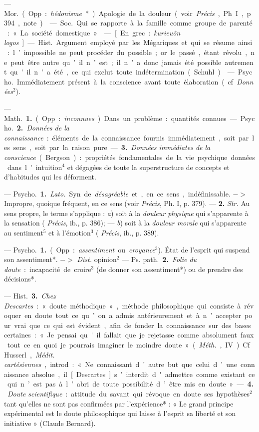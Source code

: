 \begin{itemize}[leftmargin=1cm, label=, itemsep=1pt]
 — \si{Mor.} (Opp. : {\it hédonisme}*).
Apologie de la douleur (voir  {\it Précis},
Ph. I, p. 394, note).

 — \si{Soc.} Qui se rapporte à
la famille comme groupe de parenté :
« La société domestique ».

 — [En grec : {\it kurieuôn logos}] — \si{Hist.}
Argument employé par les Mégariques et qui se résume ainsi : l’impossible ne
peut procéder du possible ; or le passé, étant révolu, ne peut être autre
qu’il n’est ; il n’a donc jamais été possible autrement qu'il n'a été, ce qui
exclut toute indétermination (Schuhl).

 — \si{Psycho.} Immédiatement
présent à la conscience avant toute
élaboration (cf. {\it Données}$^2$).

 — \si{Math.} {\bf 1.} (Opp. : {\it inconnues}).
Dans un problème : quantités connues.

— \si{Psycho.} {\bf 2.} {\it Données de la connaissance} :
éléments de la connaissance fournis immédiatement, soit
par les sens, soit par la raison pure.
— {\bf 3.} {\it Données immédiates de la conscience} (Bergson) :
propriétés fondamentales de la vie psychique données dans l'intuition$^4$
et dégagées de toute la superstructure de concepts
et d’habitudes qui les déforment.

 — \si{Psycho.} {\bf 1.} {\it Lato.} Syn. de
{\it désagréable} et, en ce sens, indéfinissable. $->$ Impropre, quoique fréquent, en ce sens (voir  {\it Précis}, Ph. I,
p. 379). — {\bf 2.} {\it Str.} Au sens propre,
le terme s’applique : {\it a}) soit à la {\it douleur physique} qui s'apparente à la
sensation ( {\it Précis}, ib., p. 386); —
{\it b}) soit à la {\it douleur morale} qui s’apparente au sentiment$^5$ et à l’émotion$^3$
( {\it Précis}, ib., p. 389).

 — \si{Psycho.} {\bf 1.} (Opp. :
{\it assentiment} ou {\it croyance}$^3$). État de l'esprit
qui suspend son assentiment*.
$->$ {\it Dist.} opinion$^2$ — \si{Ps. path.}
 {\bf 2.} {\it Folie du doute} : incapacité de
croire$^3$ (de donner son assentiment*)
ou de prendre des décisions*.

— \si{Hist.} {\bf 3.} {\it Chez Descartes} : « doute
méthodique », méthode philosophique qui consiste à révoquer en
doute tout ce qu’on a admis antérieurement et à n’accepter pour vrai
que ce qui est évident, afin de fonder
la connaissance sur des bases certaines : « Je pensai qu'il fallait que
je rejetasse comme absolument faux
tout ce en quoi je pourrais imaginer
le moindre doute » ({\it Méth.}, IV). Cf.
Husserl, {\it Médit. cartésiennes}, introd. :
« Ne connaissant d’autre but que
celui d’une connaissance absolue,
il [Descartes] s’interdit d'admettre
comme existant ce qui n’est pas à
l’abri de toute possibilité d’être mis
en doute ». — {\bf 4.} {\it Doute scientifique} :
attitude du savant qui révoque en
doute ses hypothèses$^2$ tant qu’elles
ne sont pas confirmées par l’expérience* : « Le grand principe expérimental est le doute philosophique
qui laisse à l’esprit sa liberté et son
initiative » (Claude Bernard).


\end{itemize}
